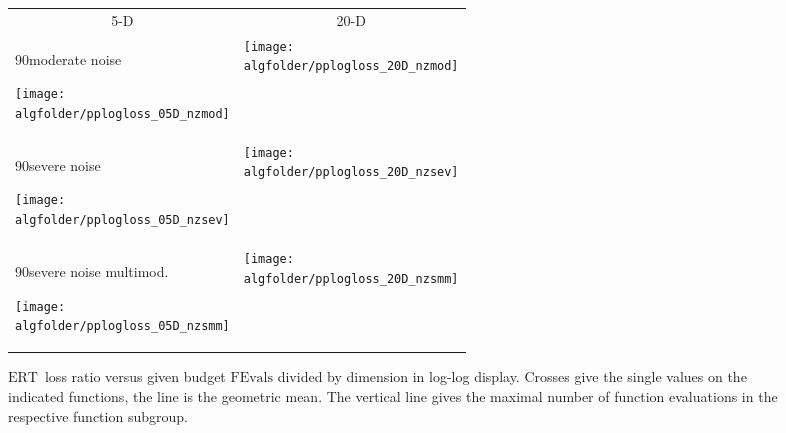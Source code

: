\documentclass{article}
\newcommand{\ERT}{\ensuremath{\mathrm{ERT}}}
\newcommand{\FEvals}{\ensuremath{\mathrm{FEvals}}}
\newcommand{\rot}[2][2.5]{
  \hspace*{-3.5\baselineskip}%
  \begin{rotate}{90}\hspace{#1em}#2
  \end{rotate}}
\begin{document}
\begin{figure}[htbp!]
\centering
\begin{tabular}{@{}ll@{}}
\multicolumn{1}{c}{5-D} & \multicolumn{1}{c}{20-D}\\
\rot[4.3]{moderate noise}
\texttt{[image: \\algfolder/pplogloss\_05D\_nzmod]} &
\texttt{[image: \\algfolder/pplogloss\_20D\_nzmod]}\\[-2ex]
\rot[4.8]{severe noise}
\texttt{[image: \\algfolder/pplogloss\_05D\_nzsev]} &
\texttt{[image: \\algfolder/pplogloss\_20D\_nzsev]}\\[-2ex]
\rot[2.6]{severe noise multimod.}
\texttt{[image: \\algfolder/pplogloss\_05D\_nzsmm]} &
\texttt{[image: \\algfolder/pplogloss\_20D\_nzsmm]}
\end{tabular}
\caption{\label{fig:ERTloglossb\algfolder}\ERT\ loss ratio versus given budget
$\FEvals$ divided by dimension in log-log display. Crosses give
the single values on the indicated functions, the line is the geometric mean.
The vertical line gives the maximal number of function evaluations in the
respective function subgroup.}
\end{figure}
\end{document}

